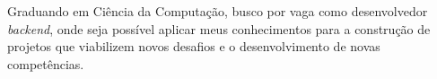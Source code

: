 \par{
    Graduando em Ciência da Computação, busco por vaga como desenvolvedor \textit{backend}, onde seja possível aplicar meus conhecimentos para a construção de projetos que viabilizem novos desafios e o desenvolvimento de novas competências.
}